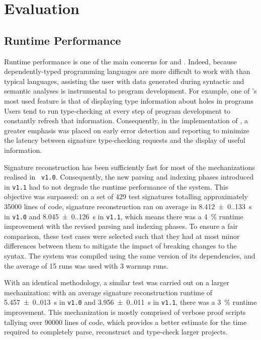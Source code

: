 \section{Evaluation}


\subsection*{Runtime Performance}


Runtime performance is one of the main concerns for \Beluga and \Harpoon.
Indeed, because dependently-typed programming languages are more difficult to work with than typical languages, assisting the user with data generated during syntactic and semantic analyses is instrumental to program development.
For example, one of \Beluga's most used feature is that of displaying type information about holes in programs
Users tend to run type-checking at every step of program development to constantly refresh that information.
Consequently, in the implementation of \Beluga, a greater emphasis was placed on early error detection and reporting to minimize the latency between signature type-checking requests and the display of useful information.


Signature reconstruction has been sufficiently fast for most of the mechanizations realised in \Beluga~\texttt{v1.0}.
Consequently, the new parsing and indexing phases introduced in \texttt{v1.1} had to not degrade the runtime performance of the system.
This objective was surpassed: on a set of \num{429} test \Beluga signatures totalling approximately \num{35000} lines of code, signature reconstruction ran on average in \SI{8.412(0.133)}{\second} in \texttt{v1.0} and \SI{8.045(0.126)}{\second} in \texttt{v1.1}, which means there was a \SI{4}{\percent} runtime improvement with the revised parsing and indexing phases.
To ensure a fair comparison, these test cases were selected such that they had at most minor differences between them to mitigate the impact of breaking changes to the syntax.
The system was compiled using the same version of its dependencies, and the average of \num{15} runs was used with \num{3} warmup runs.

With an identical methodology, a similar test was carried out on a larger mechanization: with an average signature reconstruction runtime of \SI{5.457(0.013)}{\second} in \texttt{v1.0} and \SI{3.956(0.011)}{\second} in \texttt{v1.1}, there was a \SI{3}{\percent} runtime improvement.
This mechanization is mostly comprised of verbose \Harpoon proof scripts tallying over \num{90000} lines of code, which provides a better estimate for the time required to completely parse, reconstruct and type-check larger projects.


